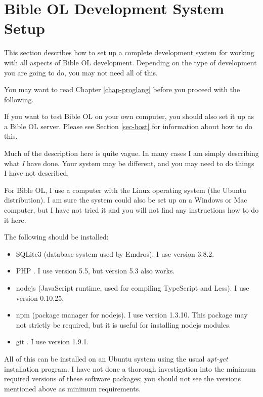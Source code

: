 \documentclass[11pt,oneside,a4paper]{memoir}
\newcommand*{\indexw}[1]{%
  #1%
  \index{#1}%
}
\begin{document}
\section{Bible OL Development System Setup}\label{sec-devel}

This section describes how to set up a complete development system for working with all aspects of
Bible OL development. Depending on the type of development you are going to do, you may not need all
of this.

You may want to read Chapter \ref{chap-proglang} before you proceed with the following.

If you want to test Bible OL on your own computer, you should also set it up as a Bible OL server.
Please see Section \ref{sec-host} for information about how to do this.

Much of the description here is quite vague. In many cases I am simply describing what \emph{I} have
done. Your system may be different, and you may need to do things I have not described.

For Bible OL, I use a computer with the Linux operating system (the Ubuntu distribution). I am sure
the system could also be set up on a Windows or Mac computer, but I have not tried it and you will
not find any instructions how to do it here.

The following should be installed:

\begin{itemize}
\item \indexw{SQLite3} (database system used by Emdros). I use version 3.8.2.
\item \indexw{PHP}. I use version 5.5, but version 5.3 also works.
\item \indexw{nodejs} (JavaScript runtime, used for compiling TypeScript and Less). I use version
  0.10.25.
\item \indexw{npm} (package manager for nodejs). I use version 1.3.10.
  This package may not strictly be required, but it is useful for installing nodejs modules.
\item \indexw{git}. I use version 1.9.1.
\end{itemize}


All of this can be installed on an Ubuntu system using the usual \emph{apt-get} installation
program. I have not done a thorough investigation into the minimum required versions of these
software packages; you should not see the versions mentioned above as minimum requirements.
\end{document}
